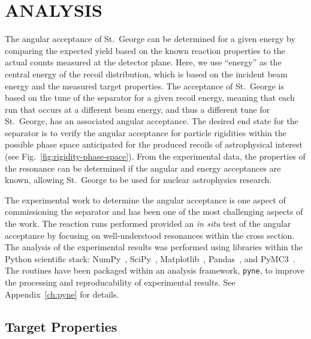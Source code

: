 
\chapter{ANALYSIS}
\label{ch:analysis}

The angular acceptance of St.\ George can be determined for a given energy by
comparing the expected yield based on the known reaction properties to the
actual counts measured at the detector plane. Here, we use ``energy'' as the
central energy of the recoil distribution, which is based on the incident beam
energy and the measured target properties. The acceptance of St.\ George is
based on the tune of the separator for a given recoil energy, meaning that
each run that occurs at a different beam energy, and thus a different tune for
St.\ George, has an associated angular acceptance. The desired end state for
the separator is to verify the angular acceptance for particle rigidities
within the possible phase space anticipated for the produced recoils of
astrophysical interest (see Fig.~\ref{fig:rigidity-phase-space}). From the
experimental data, the properties of the resonance can be determined if the
angular and energy acceptances are known, allowing St.\ George to be used for
nuclear astrophysics research.

The experimental work to determine the angular acceptance is one aspect of
commissioning the separator and has been one of the most challenging aspects of
the work. The \alpa{} reaction runs performed provided an \emph{in situ} test
of the angular acceptance by focusing on well-understood resonances within the
cross section. The analysis of the experimental results was performed using
libraries within the Python scientific stack: NumPy~\cite{NumPy},
SciPy~\cite{SciPy}, Matplotlib~\cite{Matplotlib}, Pandas~\cite{Pandas}, and
PyMC3~\cite{PyMC3}. The routines have been packaged within an analysis
framework, \verb+pyne+, to improve the processing and reproducability of
experimental results. See Appendix~\ref{ch:pyne} for details.


\section{Target Properties}
\label{sec:target-properties}


